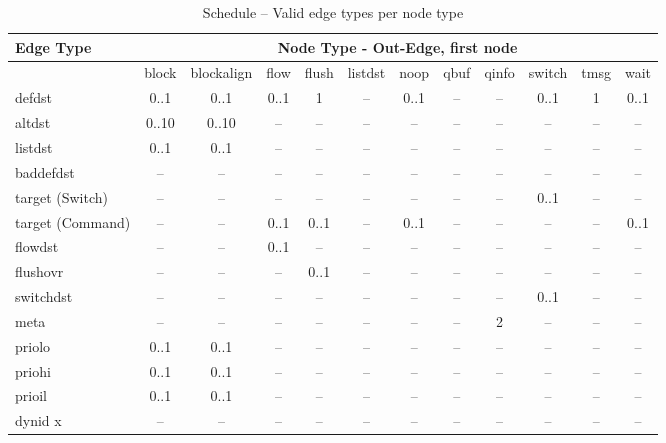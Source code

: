 \begin{table}
\begin{adjustwidth}{-25mm}{}
\caption{Schedule -- Valid edge types per node type}
\begin{tabular}[t]{|l|c|c|c|c|c|c|c|c|c|c|c|}

\hline
Edge Type & \multicolumn{11}{c|}{Node Type - Out-Edge, first node} \\
\hline
                 & block & blockalign & flow & flush & listdst & noop & qbuf & qinfo & switch & tmsg & wait \\
\hline
defdst           & 0..1  & 0..1       & 0..1 & 1     & --      & 0..1 & --   & --    & 0..1   & 1    & 0..1 \\
altdst           & 0..10 & 0..10      & --   & --    & --      & --   & --   & --    & --     & --   & --   \\
listdst          & 0..1  & 0..1       & --   & --    & --      & --   & --   & --    & --     & --   & --   \\
baddefdst        & --    & --         & --   & --    & --      & --   & --   & --    & --     & --   & --   \\
target (Switch)  & --    & --         & --   & --    & --      & --   & --   & --    & 0..1   & --   & --   \\
target (Command) & --    & --         & 0..1 & 0..1  & --      & 0..1 & --   & --    & --     & --   & 0..1 \\
flowdst          & --    & --         & 0..1 & --    & --      & --   & --   & --    & --     & --   & --   \\
flushovr         & --    & --         & --   & 0..1  & --      & --   & --   & --    & --     & --   & --   \\
switchdst        & --    & --         & --   & --    & --      & --   & --   & --    & 0..1   & --   & --   \\
meta             & --    & --         & --   & --    & --      & --   & --   & 2     & --     & --   & --   \\
priolo           & 0..1  & 0..1       & --   & --    & --      & --   & --   & --    & --     & --   & --   \\
priohi           & 0..1  & 0..1       & --   & --    & --      & --   & --   & --    & --     & --   & --   \\
prioil           & 0..1  & 0..1       & --   & --    & --      & --   & --   & --    & --     & --   & --   \\
dynid x          & --    & --         & --   & --    & --      & --   & --   & --    & --     & --   & --   \\

\end{tabular}
\end{adjustwidth}
\end{table}
